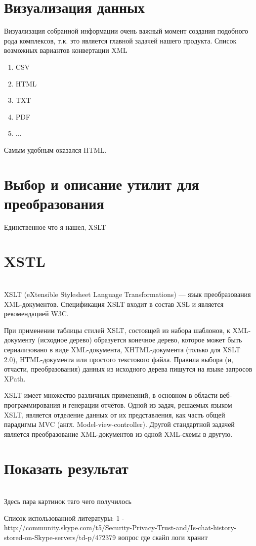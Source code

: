\chapter*{Визуализация данных}

Визуализация собранной информации очень важный момент создания подобного рода комплексов, т.к. это является главной задачей нашего продукта. 
Список возможных вариантов конвертации XML
\begin{enumerate}
\item CSV
\item HTML
\item TXT
\item PDF
\item ...
\end{enumerate}

Самым удобным оказался HTML.

\chapter*{Выбор и описание утилит для преобразования}

Единственное что я нашел, XSLT

\chapter*{XSTL}

\\XSLT (eXtensible Stylesheet Language Transformations) — язык преобразования XML-документов. Спецификация XSLT входит в состав XSL и является рекомендацией W3C.

При применении таблицы стилей XSLT, состоящей из набора шаблонов, к XML-документу (исходное дерево) образуется конечное дерево, которое может быть сериализовано в виде XML-документа, XHTML-документа (только для XSLT 2.0), HTML-документа или простого текстового файла. Правила выбора (и, отчасти, преобразования) данных из исходного дерева пишутся на языке запросов XPath.

XSLT имеет множество различных применений, в основном в области веб-программирования и генерации отчётов. Одной из задач, решаемых языком XSLT, является отделение данных от их представления, как часть общей парадигмы MVC (англ. Model-view-controller). Другой стандартной задачей является преобразование XML-документов из одной XML-схемы в другую.

\chapter*{Показать результат}

\\Здесь пара картинок таго чего получилось

Список использованной литературы:
1 -  http://community.skype.com/t5/Security-Privacy-Trust-and/Is-chat-history-stored-on-Skype-servers/td-p/472379 вопрос где скайп логи хранит